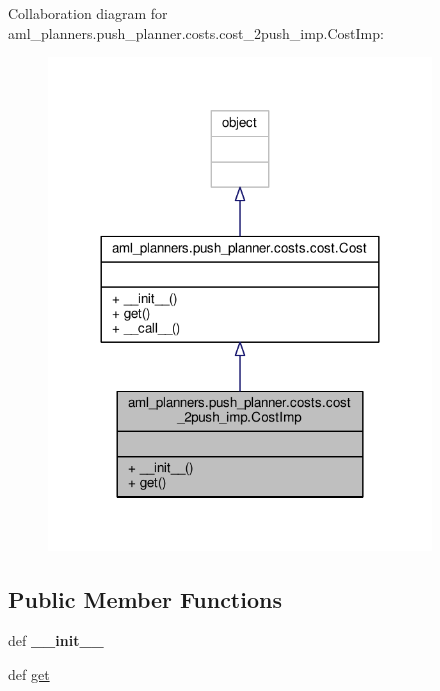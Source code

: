 Collaboration diagram for aml\-\_\-planners.\-push\-\_\-planner.\-costs.\-cost\-\_\-2push\-\_\-imp.\-Cost\-Imp\-:
\nopagebreak
\begin{figure}[H]
\begin{center}
\leavevmode
\includegraphics[width=288pt]{classaml__planners_1_1push__planner_1_1costs_1_1cost__2push__imp_1_1_cost_imp__coll__graph}
\end{center}
\end{figure}
\subsection*{Public Member Functions}
\begin{DoxyCompactItemize}
\item 
\hypertarget{classaml__planners_1_1push__planner_1_1costs_1_1cost__2push__imp_1_1_cost_imp_a5a6e792e8d9ad57d18300269a91a6ef1}{def {\bfseries \-\_\-\-\_\-init\-\_\-\-\_\-}}\label{classaml__planners_1_1push__planner_1_1costs_1_1cost__2push__imp_1_1_cost_imp_a5a6e792e8d9ad57d18300269a91a6ef1}

\item 
def \hyperlink{classaml__planners_1_1push__planner_1_1costs_1_1cost__2push__imp_1_1_cost_imp_ad1708070936f803e3bc690711dcf232f}{get}
\end{DoxyCompactItemize}


